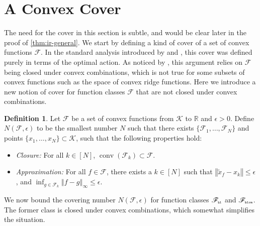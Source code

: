 \documentclass[letter, 12pt]{report}
\newcommand{\pr}{\text{\tiny\texttt{r}}}
\newcommand{\pb}{\text{\tiny\texttt{b}}}
\newcommand{\pl}{\text{\tiny\texttt{l}}}
\renewcommand{\pm}{\text{\tiny\texttt{m}}}
\newcommand{\R}{\mathbb R}
\newcommand{\norm}[1]{\left \Vert  #1 \right \Vert}
\newcommand{\cK}{\mathcal K}
\newcommand{\sF}{\mathscr F}
\newcommand{\conv}{\operatorname{conv}}
\newcommand{\1}{\mathbf{1}}
\theoremstyle{plain}
\theoremstyle{definition}
\newtheorem{definition}[theorem]{Definition}
\theoremstyle{remark}
\begin{document}
\section{A Convex Cover}\label{sec:cover}
The need for the cover in this section is subtle, and would be clear later in the proof of \cref{thm:ir-general}.
We start by defining a kind of cover of a set of convex functions $\sF$.
In the standard analysis introduced by \cite{BDKP15} and \cite{BE18}, this cover was defined purely in terms of the optimal action.
As noticed by \cite{lattimore2021minimax}, this argument relies on $\sF$ being closed under convex combinations, which is not true
for some subsets of convex functions such as the space of convex ridge functions.
Here we introduce a new notion of cover for function classes $\sF$ that are not closed
under convex combinations.
\begin{definition}\label{def:cover}
    Let $\sF$ be a set of convex functions from $\cK$ to $\R$ and $\epsilon > 0$.
    Define $N(\sF, \epsilon)$ to be the smallest number $N$ such that there exists $\{\sF_1,\ldots,\sF_N\}$ and points
    $\{
        x_1, \ldots, x_N
        \} \subset \cK$, such that the following properties hold:
    \begin{itemize}
        \item \textit{Closure:} For all $k \in [N]$, $\conv(\sF_k) \subset \sF$.
        \item \textit{Approximation:} For all $f \in \sF$, there exists a $k \in [N]$ such that $\norm{\tilde{x}_f - x_k} \leq \epsilon$, and $\inf_{g \in \sF_k} \norm{f - g}_\infty \leq \epsilon$.
    \end{itemize}
\end{definition}
We now bound the covering number $N(\sF, \epsilon)$ for function classes $\sF_{\pb\pl}$ and $\sF_{\pb\pl\pr\pm}$.
The former class is closed under convex combinations, which somewhat simplifies the situation.
\end{document}
